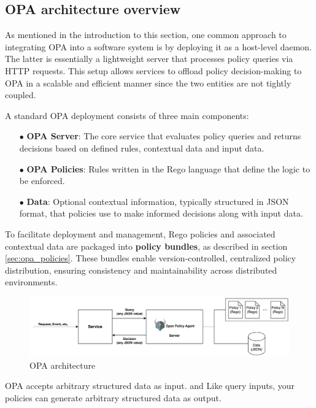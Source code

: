 \subsection{OPA architecture overview}

As mentioned in the introduction to this section, one common approach to integrating OPA into a software system is by deploying it as a host-level daemon. The latter is essentially a lightweight server that processes policy queries via HTTP requests. This setup allows services to offload policy decision-making to OPA in a scalable and efficient manner since the two entities are not tightly coupled.

A standard OPA deployment consists of three main components:

\begin{itemize}[itemsep=0.2pt, topsep=1pt]
\item[$\bullet$] \textbf{OPA Server}: The core service that evaluates policy queries and returns decisions based on defined rules, contextual data and input data.
\item[$\bullet$] \textbf{OPA Policies}: Rules written in the Rego language that define the logic to be enforced.
\item[$\bullet$] \textbf{Data}: Optional contextual information, typically structured in JSON format, that policies use to make informed decisions along with input data.
\end{itemize}

To facilitate deployment and management, Rego policies and associated contextual data are packaged into \textbf{policy bundles}, as described in section \ref{sec:opa_policies}. These bundles enable version-controlled, centralized policy distribution, ensuring consistency and maintainability across distributed environments. \newline


\begin{figure}[htb]
\centering
\includegraphics[width=1\linewidth]{images/OPA.png}
\caption{OPA architecture}
\label{fig:opa_architecture}
\end{figure}


OPA accepts arbitrary structured data as input.
and  Like query inputs, your policies can generate arbitrary structured data as output.

